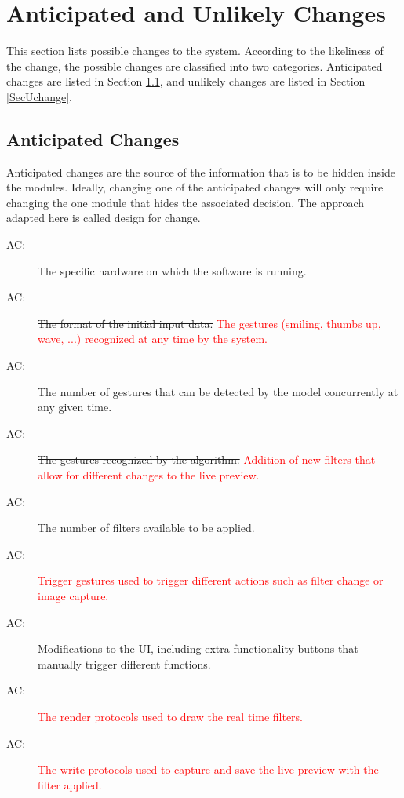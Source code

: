 \documentclass[12pt, titlepage]{article}
\newcounter{acnum}
\newcommand{\actheacnum}{AC\theacnum}
\begin{document}
\section{Anticipated and Unlikely Changes} \label{SecChange}

This section lists possible changes to the system. According to the likeliness
of the change, the possible changes are classified into two
categories. Anticipated changes are listed in Section \ref{SecAchange}, and
unlikely changes are listed in Section \ref{SecUchange}.

\subsection{Anticipated Changes} \label{SecAchange}

Anticipated changes are the source of the information that is to be hidden
inside the modules. Ideally, changing one of the anticipated changes will only
require changing the one module that hides the associated decision. The approach
adapted here is called design for
change.


\begin{description}
\item[ \actheacnum \label{acHardware}:] The specific
  hardware on which the software is running.
\item[ \actheacnum \label{acGesture}:] \sout{The format of the initial input data.} \textcolor{red}{The gestures (smiling, thumbs up, wave, ...) recognized at any time by the system.}
\item[ \actheacnum \label{acGestureNumber}:] The number of gestures that can be detected by the model concurrently at any given time.
\item[ \actheacnum \label{acFilter}:] \sout{The gestures recognized by the algorithm.} \textcolor{red}{Addition of new filters that allow for different changes to the live preview.}
\item[ \actheacnum \label{acFilterNumber}:] The number of filters available to be applied. 
\item[ \actheacnum \label{acTrigger}:] \textcolor{red}{Trigger gestures used to trigger different actions such as filter change or image capture.}
\item[ \actheacnum \label{acUI}:] Modifications to the UI, including extra functionality buttons that manually trigger different functions. \item[ \actheacnum \label{acDraw}:] \textcolor{red}{The render protocols used to draw the real time filters. }
\item[ \actheacnum \label{acSave}:] \textcolor{red}{The write protocols used to capture and save the live preview with the filter applied. }
\end{description}
\end{document}

